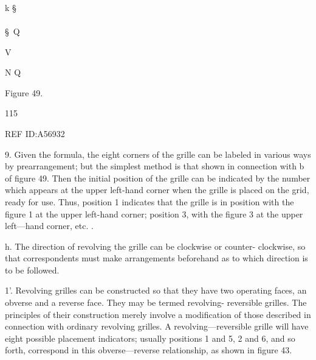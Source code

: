  

 

\\\\\\
k
§
\\\\
§\
Q

V

 

 

 

 

 

 

 

 

 

 

 

 

 

 

 

\VQkV
N
\V
Q

 

Figure 49.

115

 

 

 

REF ID:A56932

9. Given the formula, the eight corners of the grille can be labeled in
various ways by prearrangement; but the simplest method is that shown
in connection with b of ﬁgure 49. Then the initial position of the grille
can be indicated by the number which appears at the upper left-hand
corner when the grille is placed on the grid, ready for use. Thus, position
1 indicates that the grille is in position with the ﬁgure 1 at the upper
left-hand corner; position 3, with the ﬁgure 3 at the upper left—hand
corner, etc. .

h. The direction of revolving the grille can be clockwise or counter-
clockwise, so that correspondents must make arrangements beforehand
as to which direction is to be followed.

1'. Revolving grilles can be constructed so that they have two operating
faces, an obverse and a reverse face. They may be termed revolving-
reversible grilles. The principles of their construction merely involve a
modiﬁcation of those described in connection with ordinary revolving
grilles. A revolving—reversible grille will have eight possible placement
indicators; usually positions 1 and 5, 2 and 6, and so forth, correspond
in this obverse—reverse relationship, as shown in ﬁgure 43.

